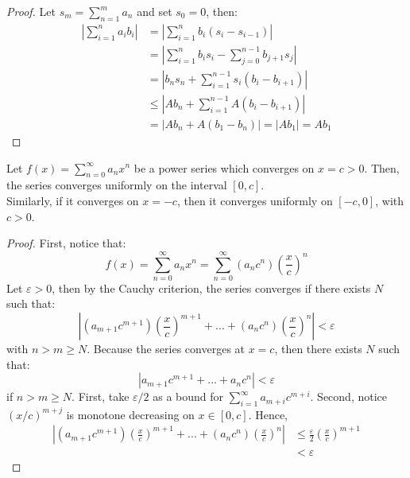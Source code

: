 \begin{proof}
    Let $s_m = \sum_{n=1}^m a_n$ and set $s_0 = 0$, then:
    \begin{align*}
        \left |
            \sum \limits_{i=1}^n a_i b_i
        \right |
        &= \left |
            \sum \limits_{i=1}^{n}b_i (s_i - s_{i-1})
        \right | \\
        &= \left |
            \sum \limits_{i=1}^{n}b_i s_i
            - \sum \limits_{j=0}^{n-1}b_{j+1} s_{j}
        \right | \\
        &= \left |
            b_n s_n + \sum \limits_{i=1}^{n-1} s_i(b_i - b_{i+1})
        \right | \\
        &\leq \left |
            A b_n + \sum \limits_{i=1}^{n-1} A (b_i - b_{i+1})
        \right | \\
        &= \left |
            A b_n + A (b_1 - b_n)
        \right | = |A b_1| = A b_1
    \end{align*}
\end{proof}

\begin{theorem}
    Let $f(x) = \sum_{n=0}^\infty a_n x^n$ be a power series which converges on $x = c > 0$. Then, the series converges uniformly on the interval $[0, c]$. \\
    Similarly, if it converges on $x = -c$, then it converges uniformly on $[-c, 0]$, with $c > 0$. 
\end{theorem}

\begin{proof}
    First, notice that:
    \begin{equation*}
        f(x) = \sum \limits_{n=0}^\infty a_n x^n = \sum \limits_{n=0}^\infty (a_n c^n) \left(\frac{x}{c}\right)^n
    \end{equation*}
    Let $\varepsilon > 0$, then by the Cauchy criterion, the series converges if there exists $N$ such that:
    \begin{equation*}
        \left |
            (a_{m+1}c^{m+1})\left(\frac{x}{c}\right)^{m+1}
            + ...
            + (a_{n}c^{n})\left(\frac{x}{c}\right)^{n} 
        \right |
        < \varepsilon
    \end{equation*}
    with $n > m \geq N$. Because the series converges at $x = c$, then there exists $N$ such that:
    \begin{equation*}
        \left |
            a_{m+1}c^{m+1} + ... + a_n c^n
        \right | <  \varepsilon
    \end{equation*}
    if $n > m \geq N$. First, take $\varepsilon/2$ as a bound for $\sum_{i=1}^\infty a_{m+i}c^{m+i}$. Second, notice $(x/c)^{m+j}$ is monotone decreasing on $x \in [0, c]$. Hence, 
    \begin{align*}
        \left |
            (a_{m+1}c^{m+1})\left(\frac{x}{c}\right)^{m+1}
            + ...
            + (a_{n}c^{n})\left(\frac{x}{c}\right)^{n} 
        \right |
        &\leq \frac{\varepsilon}{2}\left(\frac{x}{c}\right)^{m+1}\\
        &< \varepsilon
    \end{align*}
\end{proof}

